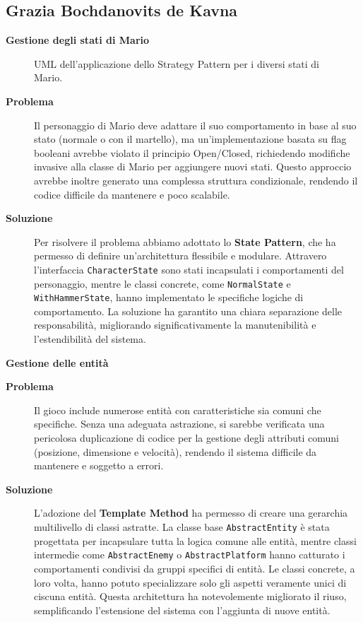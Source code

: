 \documentclass[a4paper,12pt]{report}
\begin{document}
\subsection{Grazia Bochdanovits de Kavna}
\textbf{Gestione degli stati di Mario}
\begin{figure}[H]
	\centering{}
	
	\caption{UML dell'applicazione dello Strategy Pattern per i diversi stati di Mario.}
	\label{img:MarioState}
\end{figure}
\begin{description}
	\item[\textbf{Problema}]
	      Il personaggio di Mario deve adattare il suo comportamento in base al suo stato (normale o con il martello), ma un'implementazione basata su flag booleani avrebbe violato il principio Open/Closed,
	      richiedendo modifiche invasive alla classe di Mario per aggiungere nuovi stati. Questo approccio avrebbe inoltre generato una complessa struttura condizionale, rendendo il codice difficile da mantenere e poco scalabile.

	\item[\textbf{Soluzione}]
	      Per risolvere il problema abbiamo adottato lo \textbf{State Pattern}, che ha permesso di definire un'architettura flessibile e modulare. Attravero l'interfaccia \texttt{CharacterState} sono stati
	      incapsulati i comportamenti del personaggio, mentre le classi concrete, come \texttt{NormalState} e \texttt{WithHammerState}, hanno implementato le specifiche logiche di comportamento.
	      La soluzione ha garantito una chiara separazione delle responsabilità, migliorando significativamente la manutenibilità e l'estendibilità del sistema.
\end{description}

\noindent
\textbf{Gestione delle entità}
\begin{description}
	\item[\textbf{Problema}]
	      Il gioco include numerose entità con caratteristiche sia comuni che specifiche. Senza una adeguata astrazione, si sarebbe verificata una pericolosa duplicazione di codice per la gestione degli attributi
	      comuni (posizione, dimensione e velocità), rendendo il sistema difficile da mantenere e soggetto a errori.

	\item[\textbf{Soluzione}]
	      L'adozione del \textbf{Template Method} ha permesso di creare una gerarchia multilivello di classi astratte. La classe base \texttt{AbstractEntity} è stata progettata per incapsulare tutta la logica comune
	      alle entità, mentre classi intermedie come \texttt{AbstractEnemy} o \texttt{AbstractPlatform} hanno catturato i comportamenti condivisi da gruppi specifici di entità.
	      Le classi concrete, a loro volta, hanno potuto specializzare solo gli aspetti veramente unici di ciscuna entità. Questa architettura ha notevolemente migliorato il riuso, semplificando l'estensione del sistema
	      con l'aggiunta di nuove entità.

\end{description}
\end{document}
